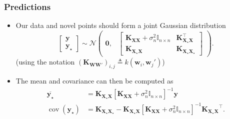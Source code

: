 \documentclass[9pt,hyperref={pdfpagelabels=false},xcolor=table]{beamer}
\begin{document}
\begin{frame}
    \frametitle{Predictions}
    \begin{itemize}
        \item Our data and novel points should form a joint Gaussian distribution
              \[
                  \begin{bmatrix}
                      \bm{y} \\
                      \bm{y}_{\star}
                  \end{bmatrix}
                  \sim \mathcal{N}
                  \begin{pmatrix}
                      \bm{0}, &
                      {
                              \begin{bmatrix}
                                  \bm{K_{XX}} + \sigma_n^2 \mathbb{I}_{n \times n} & \bm{K_{X_{\star}X}^{\intercal}} \\
                                  \bm{K_{X_{\star}X}}                              & \bm{K_{X_{\star}X_{\star}}}
                              \end{bmatrix}
                          }
                  \end{pmatrix}.
              \]
              (using the notation $\left( \bm{K}_{\bm{W} \bm{W}'} \right)_{i,j} \triangleq k \left( \bm{w}_i , \bm{w}_j' \right)$)
              \pause
        \item The mean and covariance can then be computed as
              \begin{align*}
                  \overline{\bm{y}_{\star}}           & = \bm{K_{X_{\star}X}} \left[ \bm{K_{XX}} + \sigma_n^2 \mathbb{I}_{n \times n} \right]^{-1} \bm{y}                                                         \\
                  \operatorname{cov} (\bm{y}_{\star}) & = \bm{K_{X_{\star}X_{\star}}} - \bm{K_{X_{\star}X}} \left[ \bm{K_{XX}} + \sigma_n^2 \mathbb{I}_{n \times n} \right]^{-1} \bm{K_{X_{\star}X}}^{\intercal}.
              \end{align*}
    \end{itemize}
\end{frame}
\end{document}
